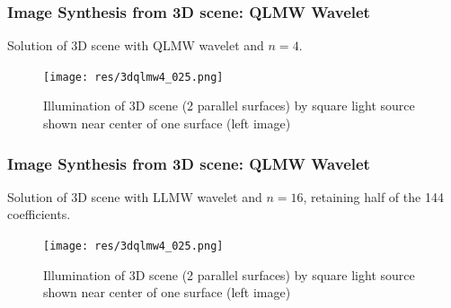 \begin{frame}\frametitle{Image Synthesis from 3D scene: QLMW Wavelet}
Solution of 3D scene with QLMW wavelet and $n=4$.

\vspace{-2 mm}
 \begin{figure}
              \centering
              \texttt{[image: res/3dqlmw4\_025.png]}
              \vspace{-2 mm}
              \caption{Illumination of 3D scene (2 parallel surfaces) by square light source shown near center of one surface (left image)}
              \label{fig_e_vs_n_f1}
              \end{figure}
\end{frame}


\begin{frame}\frametitle{Image Synthesis from 3D scene: QLMW Wavelet}
Solution of 3D scene with LLMW wavelet and $n=16$, retaining half of the 144 coefficients.

\vspace{-2 mm}
 \begin{figure}
              \centering
              \texttt{[image: res/3dqlmw4\_025.png]}
              \vspace{-2 mm}
              \caption{Illumination of 3D scene (2 parallel surfaces) by square light source shown near center of one surface (left image)}
              \label{fig_e_vs_n_f1}
              \end{figure}
\end{frame}



